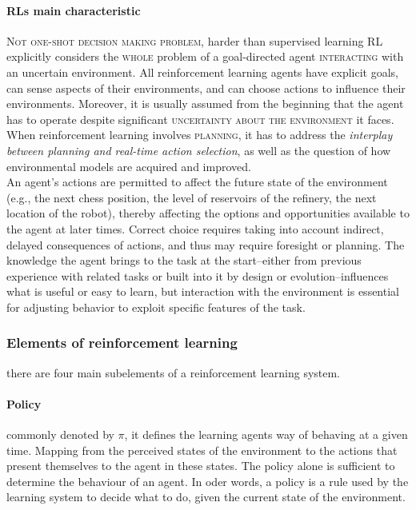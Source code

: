 \documentclass[11pt]{article}
\begin{document}
\paragraph{RLs main characteristic}
\textsc{Not one-shot decision making problem}, harder than supervised learning
RL explicitly considers the \textsc{whole} problem of a goal-directed agent \textsc{interacting} with an uncertain environment. All reinforcement learning agents have explicit goals, can sense aspects of their environments, and can choose actions to influence their environments. Moreover, it is usually assumed from the beginning that the agent has to operate despite significant \textsc{uncertainty about the environment} it faces. When reinforcement learning involves \textsc{planning}, it has to address the \textit{interplay between planning and real-time action selection}, as well as the question of how environmental models are acquired and improved.\\
An agent's actions are permitted to affect the future state of the environment (e.g., the next chess position, the level of reservoirs of the refinery, the next location of the robot), thereby affecting the options and opportunities available to the agent at later times. Correct choice requires taking into account indirect, delayed consequences of actions, and thus may require foresight or planning. The knowledge the agent brings to the task at the start--either from previous experience with related tasks or built into it by design or evolution--influences what is useful or easy to learn, but interaction with the environment is essential for adjusting behavior to exploit specific features of the task.

\subsubsection{Elements of reinforcement learning}
there are four main subelements of a reinforcement learning system.

\paragraph{Policy}
commonly denoted by $\pi$, it defines the learning agents way of behaving at a given time. Mapping from the perceived states of the environment to the actions that present themselves to the agent in these states. The policy alone is sufficient to determine the behaviour of an agent. In oder words, a policy is a rule used by the learning system to decide what to do, given the current state of the environment.
\end{document}
